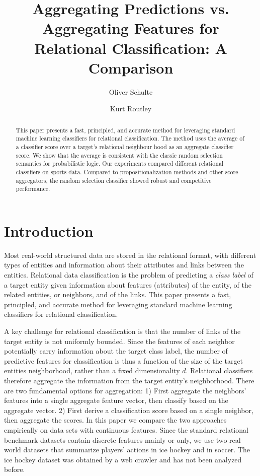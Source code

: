 \documentclass[oribibl]{llncs}%
\institute{School of Computing Science,   Simon Fraser University,\\ Burnaby,
B.C.,   Canada~V5A~1S6,   \email{oschulte@cs.sfu.ca,kdr4@sfu.ca}   }
\begin{document}
\title{Aggregating Predictions vs. Aggregating Features for Relational Classification: A Comparison}
\author{Oliver Schulte
\and Kurt Routley}
\maketitle


\begin{abstract} This paper presents a fast, principled, and accurate method for leveraging standard machine learning classifiers for relational classification. The method uses the average of a classifier score over a target's relational neighbour hood as an aggregate classifier score. We show that the average is consistent with the classic random selection semantics for probabilistic logic. Our experiments compared different relational classifiers on sports data. Compared to propositionalization methods and other score aggregators, the random selection classifier showed robust and competitive performance. 
\end{abstract}


\section{Introduction} Most real-world structured data are stored in the relational format, with different types of entities and information about their attributes and links between the entities.
Relational data classification is the problem of predicting a {\em class label} of a target entity given information about features (attributes) of the entity, of the related entities, or neighbors, and of the links. This paper presents a fast, principled, and accurate method for leveraging standard machine learning classifiers for relational classification.

A key challenge for relational classification is that the number of links of the target entity is not uniformly bounded. Since the features of each neighbor potentially carry information about the target class label, the number of predictive features for classification is thus a function of the size of the target entities neighborhood, rather than a fixed dimensionality $d$. Relational classifiers therefore aggregate the information from the target entity's neighborhood. There are two fundamental options for aggregation: 1) First aggregate the neighbors' features into a single aggregate feature vector, then classify based on the aggregate vector. 2) First derive a classification score based on a single neighbor, then aggregate the scores. 
%
In this paper we compare the two approaches empirically on data sets with continuous features. Since the standard relational benchmark datasets contain discrete features mainly or only, we use two real-world datasets that summarize players' actions in ice hockey and in soccer. The ice hockey dataset was obtained by a web crawler and has not been analyzed before.
\end{document}
